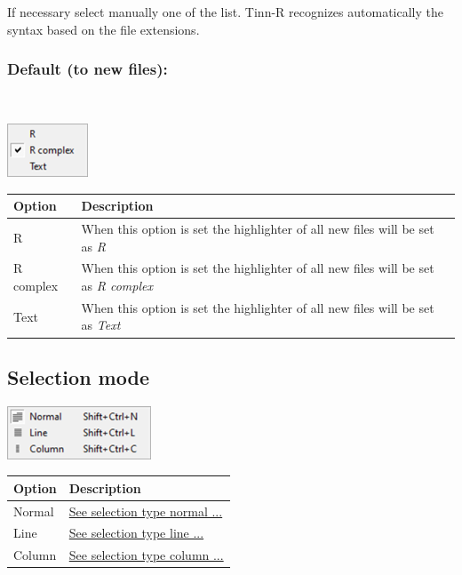 If necessary select manually one of the list. Tinn-R recognizes
automatically the syntax based on the file extensions.


\hypertarget{menu_options_syntax_default}{}
\subsubsection{Default (to new files):}\\

\includegraphics[scale=0.50]{./res/menu_options_syntax_default.png}\\

\begin{scriptsize}
  \begin{tabularx}{\textwidth}{>{\hsize=0.2\hsize}X>{\hsize=0.8\hsize}X}\\
    \hline
    \textbf{Option} & \textbf{Description} \\
    \hline
    R & When this option is set the highlighter of all new files will be set as \textit{R} \\
    R complex & When this option is set the highlighter of all new files will be set as \textit{R complex} \\
    Text & When this option is set the highlighter of all new files will be set as \textit{Text} \\
    \hline
  \end{tabularx}
\end{scriptsize}


\hypertarget{menu_options_selectionmode}{}
\subsection{Selection mode}

\includegraphics[scale=0.50]{./res/menu_options_selectionmode.png}\\

\begin{scriptsize}
  \begin{tabularx}{\textwidth}{>{\hsize=0.3\hsize}X>{\hsize=0.7\hsize}X}\\
    \hline
    \textbf{Option} & \textbf{Description} \\
    \hline
    Normal & \href{\#working\_selectionmode\_normal}{See selection type normal ...} \\
    Line & \href{\#working\_selectionmode\_line}{See selection type line ...} \\
    Column & \href{\#working\_selectionmode\_column}{See selection type column ...} \\
    \hline
  \end{tabularx}
\end{scriptsize}
